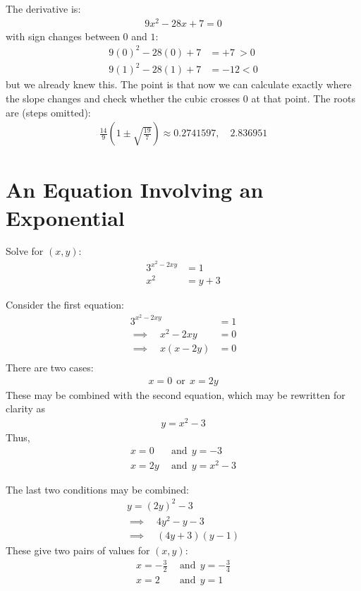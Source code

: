 \documentclass[12pt]{article}
\begin{document}
\begin{answer}
The derivative is:
\begin{align*}
9 x^{2} - 28 x + 7 = 0
\end{align*}
with sign changes between $0$ and $1$:
\begin{align*}
9(0)^{2} - 28(0) + 7 & = +7 ~ > 0 \\
9(1)^{2} - 28(1) + 7 & = -12 < 0 
\end{align*}
but we already knew this. The point is that now we can calculate exactly where the slope changes and check whether the cubic crosses $0$ at that point. The roots are (steps omitted):
\begin{align*}
\frac{14}{9} \left(1 \pm \sqrt{\frac{19}{7}}\right) 
\approx 0.2741597, \hspace{1em} 2.836951 
\end{align*}

\end{answer}


\section*{An Equation Involving an Exponential}
Solve for $(x,y)$:
\begin{align*}
3^{x^{2}-2xy} & = 1 \\
x^{2} & = y + 3
\end{align*}

\begin{answer}
Consider the first equation:
\begin{align*}
3^{x^{2}-2xy} & = 1 \\
\implies \hspace{1em} 
x^{2}-2xy & = 0 \\
\implies \hspace{1em} 
x(x-2y) & = 0 \\
\end{align*}
There are two cases:
\begin{align*}
x = 0 ~~\text{or}~~ x=2y
\end{align*}
These may be combined with the second equation, which may be rewritten for clarity as
\begin{align*}
y = x^{2} - 3
\end{align*}
Thus,
\begin{align*}
x = 0 & ~~\text{and}~~ y = -3 \\
x = 2y & ~~\text{and}~~ y = x^{2} - 3
\end{align*}

The last two conditions may be combined:
\begin{align*}
y = (2y)^{2} - 3 \\
\implies \hspace{1em} 
4 y^{2} - y - 3 \\
\implies \hspace{1em} 
(4y + 3) (y - 1)
\end{align*}
These give two pairs of values for $(x,y)$:
\begin{align*}
x = -\frac{3}{2} & ~~\text{and}~~ y = -\frac{3}{4} \\
x = 2 & ~~\text{and}~~ y = 1
\end{align*}
\end{answer}
\end{document}

